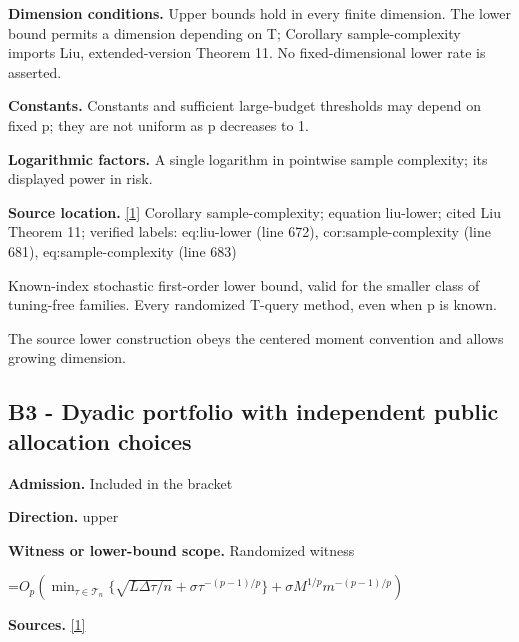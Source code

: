 \documentclass[10pt,a4paper]{article}
\newcommand{\AtlasMath}[1]{\par\begingroup\centering\setbox0=\hbox{$\displaystyle #1$}\ifdim\wd0>1.4\linewidth\typeout{ATLAS WIDE FORMULA: \the\wd0}\fi\ifdim\wd0>\linewidth\resizebox{\linewidth}{!}{\box0}\else\box0\fi\par\endgroup}
\begin{document}
\textbf{Dimension conditions.} Upper bounds hold in every finite dimension. The lower bound permits a dimension depending on T; Corollary sample-complexity imports Liu, extended-version Theorem 11. No fixed-dimensional lower rate is asserted.



\textbf{Constants.} Constants and sufficient large-budget thresholds may depend on fixed p; they are not uniform as p decreases to 1.



\textbf{Logarithmic factors.} A single logarithm in pointwise sample complexity; its displayed power in risk.



\textbf{Source location.} \href{https://github.com/WU-Wendao/Colombo/blob/main/colombo_sensorium/Complexity_altas/data/sources/colombo/N05/manuscript.pdf}{[1]} Corollary sample-complexity; equation liu-lower; cited Liu Theorem 11; verified labels: eq:liu-lower (line 672), cor:sample-complexity (line 681), eq:sample-complexity (line 683)



Known-index stochastic first-order lower bound, valid for the smaller class of tuning-free families. Every randomized T-query method, even when p is known.



The source lower construction obeys the centered moment convention and allows growing dimension.



\subsection{B3 - Dyadic portfolio with independent public allocation choices}


\textbf{Admission.} Included in the bracket



\textbf{Direction.} upper



\textbf{Witness or lower-bound scope.} Randomized witness



\AtlasMath{O_p\!\left(\min_{\tau\in\mathcal T_n}\{\sqrt{L\Delta\tau/n}+\sigma\tau^{-(p-1)/p}\}+\sigma M^{1/p}m^{-(p-1)/p}\right)}


\textbf{Sources.} \href{https://github.com/WU-Wendao/Colombo/blob/main/colombo_sensorium/Complexity_altas/data/sources/colombo/N05/manuscript.pdf}{[1]}
\end{document}
